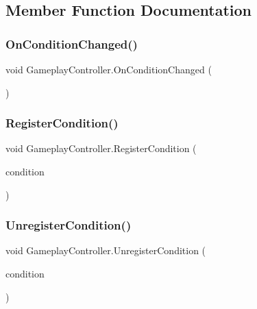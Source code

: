 \subsection{Member Function Documentation}
\mbox{\label{class_gameplay_controller_ad54b80a1e76c02f2c09652f2700189bf}} 
\subsubsection{\texorpdfstring{On\+Condition\+Changed()}{OnConditionChanged()}}
{\footnotesize\ttfamily void Gameplay\+Controller.\+On\+Condition\+Changed (\begin{DoxyParamCaption}{ }\end{DoxyParamCaption})}

\mbox{\label{class_gameplay_controller_abb7793cefa2ef8e6ccf602755a1b4c60}} 
\subsubsection{\texorpdfstring{Register\+Condition()}{RegisterCondition()}}
{\footnotesize\ttfamily void Gameplay\+Controller.\+Register\+Condition (\begin{DoxyParamCaption}\item[{\mbox{\hyperlink{class_gameplay_condition}{Gameplay\+Condition}}}]{condition }\end{DoxyParamCaption})}

\mbox{\label{class_gameplay_controller_aec5100ce654fbef3c650d9a404b6f684}} 
\subsubsection{\texorpdfstring{Unregister\+Condition()}{UnregisterCondition()}}
{\footnotesize\ttfamily void Gameplay\+Controller.\+Unregister\+Condition (\begin{DoxyParamCaption}\item[{\mbox{\hyperlink{class_gameplay_condition}{Gameplay\+Condition}}}]{condition }\end{DoxyParamCaption})}



